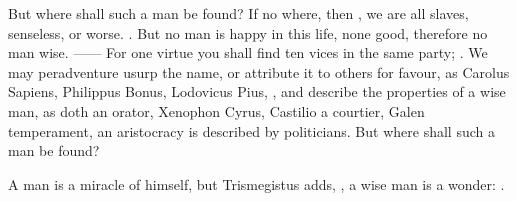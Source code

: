 But where shall such a man be found? If no where, then , we are
all slaves, senseless, or worse. . But no man is happy in
this life, none good, therefore no man wise. ------ For one virtue you
shall find ten vices in the same party; .
We may peradventure usurp the name, or attribute it to others for favour, as
Carolus Sapiens, Philippus Bonus, Lodovicus Pius, \etc{}, and describe the
properties of a wise man, as \Tully doth an orator, Xenophon Cyrus, Castilio a
courtier, Galen temperament, an aristocracy is described by politicians. But
where shall such a man be found?


A man is a miracle of himself, but Trismegistus adds, , a wise man is a wonder: .

